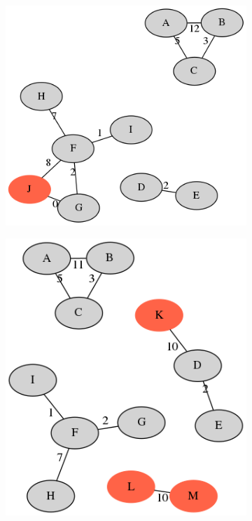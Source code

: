 \begin{figure}
     \centering
     \begin{subfigure}[b]{0.4\textwidth}
         \centering
         \includegraphics[width=\textwidth]{Appendix1/Figs/illumina-cluster-example.png}
         \caption{}
         \label{fig:example-truth}
     \end{subfigure}
     \hfill
     \begin{subfigure}[b]{0.4\textwidth}
         \centering
         \includegraphics[width=\textwidth]{Appendix1/Figs/ont-cluster-example.png}

\end{subfigure}
\end{figure}

